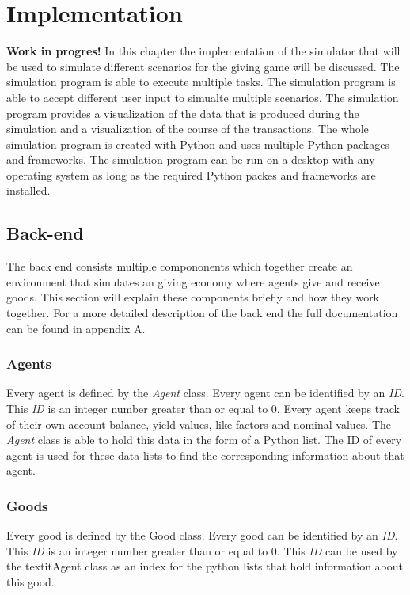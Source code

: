 \documentclass[twoside,openright]{uva-bachelor-thesis}
\begin{document}
\chapter{Implementation}
\textbf{Work in progres!}
In this chapter the implementation of the simulator that will be used to simulate different scenarios for the giving game will be discussed. The simulation program is able to execute multiple tasks. The simulation program is able to accept different user input to simualte multiple scenarios. The simulation program provides a visualization of the data that is produced during the simulation and a visualization of the course of the transactions. The whole simulation program is created with Python and uses multiple Python packages and frameworks. The simulation program can be run on a desktop with any operating system as long as the required Python packes and frameworks are installed. 

\section{Back-end}
The back end consists multiple compononents which together create an environment that simulates an giving economy where agents give and receive goods. This section will explain these components briefly and how they work together. For a more detailed description of the back end the full documentation can be found in appendix A.

\subsection{Agents}
Every agent is defined by the \textit{Agent} class. Every agent can be identified by an \textit{ID}. This \textit{ID} is an integer number greater than or equal to 0. Every agent keeps track of their own account balance, yield values, like factors and nominal values. The \textit{Agent} class is able to hold this data in the form of a Python list. The ID of every agent is used for these data lists to find the corresponding information about that agent.

\subsection{Goods}
Every good is defined by the Good class.  Every good can be identified by an \textit{ID}. This \textit{ID} is an integer number greater than or equal to 0. This \textit{ID} can be used by the textit{Agent} class as an index for the python lists that hold information about this good.
\end{document}
